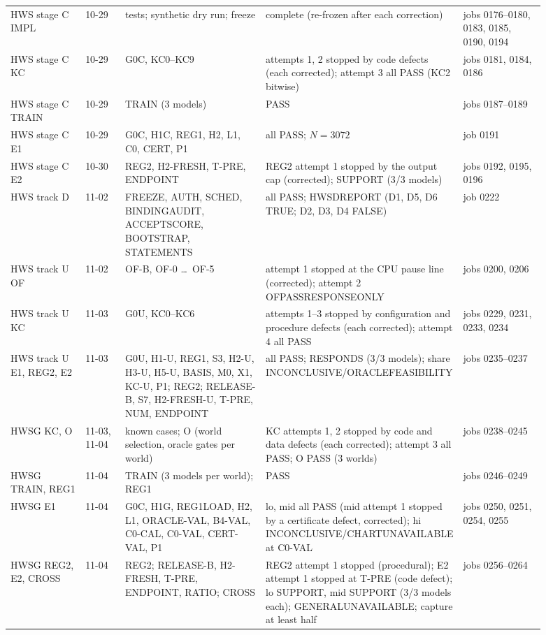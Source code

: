 \documentclass[11pt,a4paper]{article}
\DeclareRobustCommand{\_}{\ifmmode\origunderscore\else\textunderscore\allowbreak\fi}
\begin{document}
\begin{longtable}{@{}L{0.15\linewidth}L{0.08\linewidth}L{0.28\linewidth}L{0.21\linewidth}L{0.17\linewidth}@{}}
HWS stage C IMPL & 10-29 & tests; synthetic dry run; freeze & complete (re-frozen after each correction) & jobs 0176--0180, 0183, 0185, 0190, 0194\\
HWS stage C KC & 10-29 & G0C, KC0--KC9 & attempts 1, 2 stopped by code defects (each corrected); attempt 3 all PASS (KC2 bitwise) & jobs 0181, 0184, 0186\\
HWS stage C TRAIN & 10-29 & TRAIN (3 models) & PASS & jobs 0187--0189\\
HWS stage C E1 & 10-29 & G0C, H1C, REG1, H2, L1, C0, CERT, P1 & all PASS; $N=3072$ & job 0191\\
HWS stage C E2 & 10-30 & REG2, H2-FRESH, T-PRE, ENDPOINT & REG2 attempt 1 stopped by the output cap (corrected); SUPPORT (3/3 models) & jobs 0192, 0195, 0196\\
HWS track D & 11-02 & FREEZE, AUTH, SCHED, BINDING\_AUDIT, ACCEPT\_SCORE, BOOTSTRAP, STATEMENTS & all PASS; HWSD\_REPORT (D1, D5, D6 TRUE; D2, D3, D4 FALSE) & job 0222\\
HWS track U OF & 11-02 & OF-B, OF-0 \ldots\ OF-5 & attempt 1 stopped at the CPU pause line (corrected); attempt 2 OF\_PASS\_RESPONSE\_ONLY & jobs 0200, 0206\\
HWS track U KC & 11-03 & G0U, KC0--KC6 & attempts 1--3 stopped by configuration and procedure defects (each corrected); attempt 4 all PASS & jobs 0229, 0231, 0233, 0234\\
HWS track U E1, REG2, E2 & 11-03 & G0U, H1-U, REG1, S3, H2-U, H3-U, H5-U, BASIS, M0, X1, KC-U, P1; REG2; RELEASE-B, S7, H2-FRESH-U, T-PRE, NUM, ENDPOINT & all PASS; RESPONDS (3/3 models); share INCONCLUSIVE/\allowbreak ORACLE\_FEASIBILITY & jobs 0235--0237\\
HWSG KC, O & 11-03, 11-04 & known cases; O (world selection, oracle gates per world) & KC attempts 1, 2 stopped by code and data defects (each corrected); attempt 3 all PASS; O PASS (3 worlds) & jobs 0238--0245\\
HWSG TRAIN, REG1 & 11-04 & TRAIN (3 models per world); REG1 & PASS & jobs 0246--0249\\
HWSG E1 & 11-04 & G0C, H1G, REG1\_LOAD, H2, L1, ORACLE-VAL, B4-VAL, C0-CAL, C0-VAL, CERT-VAL, P1 & lo, mid all PASS (mid attempt 1 stopped by a certificate defect, corrected); hi INCONCLUSIVE/\allowbreak CHART\_UNAVAILABLE at C0-VAL & jobs 0250, 0251, 0254, 0255\\
HWSG REG2, E2, CROSS & 11-04 & REG2; RELEASE-B, H2-FRESH, T-PRE, ENDPOINT, RATIO; CROSS & REG2 attempt 1 stopped (procedural); E2 attempt 1 stopped at T-PRE (code defect); lo SUPPORT, mid SUPPORT (3/3 models each); GENERAL\_UNAVAILABLE; capture at least half & jobs 0256--0264\\
\bottomrule
\end{longtable}
\normalsize
\end{document}
